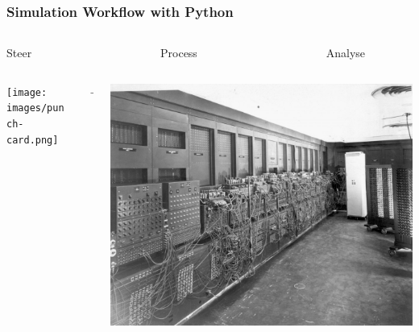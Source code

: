 \begin{frame}
  \frametitle{Simulation Workflow with Python}
  \begin{columns}
    \begin{column}{.3\textwidth}
      \centerline{Steer}
    \end{column}
    \begin{column}{.05\textwidth}
    \end{column}
    \begin{column}{.3\textwidth}
      \centerline{Process}
    \end{column}
    \begin{column}{.05\textwidth}
    \end{column}
    \begin{column}{.3\textwidth}
      \centerline{Analyse}
    \end{column}
  \end{columns}
  \begin{columns}
    \begin{column}{.3\textwidth}
      \begin{center}
        \texttt{[image: images/punch-card.png]}
      \end{center}
    \end{column}
    \begin{column}{.05\textwidth}
      \centerline{$\longrightarrow$}
    \end{column}
    \begin{column}{.3\textwidth}
      \begin{center}
        \includegraphics[width=.9\textwidth]{images/eniac.jpg}
      \end{center}

\end{column}
\end{columns}
\end{frame}
